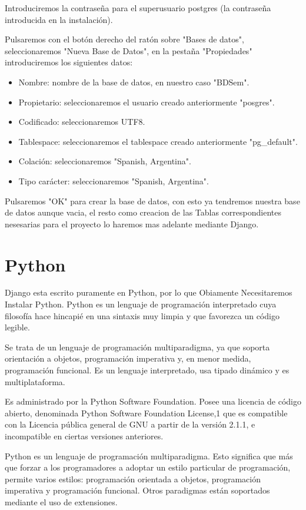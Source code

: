 Introduciremos la contraseña para el superusuario postgres
(la contraseña introducida en la instalación).

Pulsaremos con el botón derecho del ratón sobre "Bases de datos", seleccionaremos
"Nueva Base de Datos", en la pestaña "Propiedades" introduciremos los
siguientes datos:

\begin{itemize}
    \item Nombre: nombre de la base de datos, en nuestro caso "BDSem".
    \item Propietario: seleccionaremos el usuario creado anteriormente "posgres".
    \item Codificado: seleccionaremos UTF8.
    \item Tablespace: seleccionaremos el tablespace creado anteriormente "pg\_default".
    \item Colación: seleccionaremos "Spanish, Argentina".
    \item Tipo carácter: seleccionaremos "Spanish, Argentina".
\end{itemize}

Pulsaremos "OK" para crear la base de datos, con esto ya tendremos nuestra base
de datos aunque vacia, el resto como creacion de las Tablas correspondientes
nesesarias para el proyecto lo haremos mas adelante mediante Django.


\section{Python}

Django esta escrito puramente en Python, por lo que Obiamente Necesitaremos Instalar
Python. Python es un lenguaje de programación interpretado cuya filosofía hace
 hincapié en una sintaxis muy limpia y que favorezca un código legible.
 
Se trata de un lenguaje de programación multiparadigma, ya que soporta
orientación a objetos, programación imperativa y, en menor medida, programación
funcional. Es un lenguaje interpretado, usa tipado dinámico y es multiplataforma.

Es administrado por la Python Software Foundation. Posee una licencia de código
abierto, denominada Python Software Foundation License,1 que es compatible con
la Licencia pública general de GNU a partir de la versión 2.1.1, e
incompatible en ciertas versiones anteriores.

Python es un lenguaje de programación multiparadigma. Esto significa que más
que forzar a los programadores a adoptar un estilo particular de programación,
permite varios estilos: programación orientada a objetos, programación imperativa
y programación funcional. Otros paradigmas están soportados mediante el uso
de extensiones.

